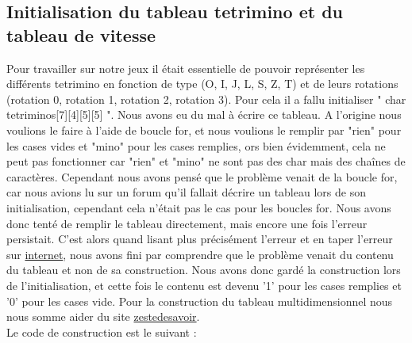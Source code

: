 \documentclass[a4paper,10p]{report}
\begin{document}
\subsection{Initialisation du tableau tetrimino et du tableau de vitesse}
\label{tetrimino}
Pour travailler sur notre jeux il était essentielle de pouvoir représenter les différents tetrimino en fonction de type (O, I, J, L, S, Z, T) et de leurs rotations (rotation 0, rotation 1, rotation 2, rotation 3). Pour cela il a fallu initialiser " char tetriminos[7][4][5][5] ". Nous avons eu du mal à écrire ce tableau. A l'origine nous voulions le faire à l'aide de boucle for, et nous voulions le remplir par "rien" pour les cases vides et "mino" pour les cases remplies, ors bien évidemment, cela ne peut pas fonctionner car "rien" et "mino" ne sont pas des char mais des chaînes de caractères. Cependant nous avons pensé que le problème venait de la boucle for, car nous avions lu
sur un forum qu'il fallait décrire un tableau lors de son initialisation, cependant cela n'était pas le cas pour les boucles for. Nous avons donc tenté de remplir le tableau directement, mais encore une fois l'erreur persistait. C'est alors quand lisant plus précisément l'erreur et en taper l'erreur sur \href{https://openclassrooms.com/forum/sujet/message-d-erreur-29}{internet}, nous avons fini par comprendre que le problème venait du contenu du tableau et non de sa construction. Nous avons donc gardé la construction lors de l'initialisation, et cette fois le contenu est devenu '1' pour les cases remplies et '0' pour les cases vide. Pour la construction du tableau multidimensionnel nous nous somme aider du site \href{https://zestedesavoir.com/tutoriels/755/le-langage-c-1/1043_aggregats-memoire-et-fichiers/4281_les-tableaux/#3-14094_les-tableaux-multidimensionnels}{zestedesavoir}.
\\Le code de construction est le suivant :
\end{document}
